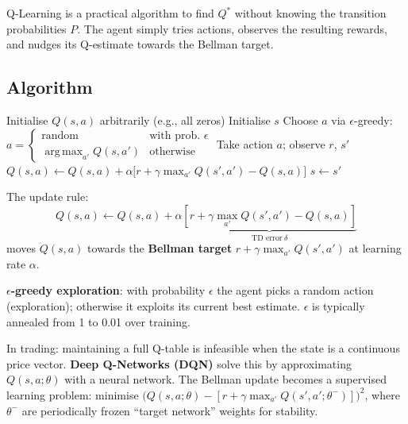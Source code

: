 \documentclass[12pt,a4paper]{article}
\DeclareMathOperator*{\argmax}{arg\,max}
\begin{document}
\begin{insbox}
Q-Learning is a practical algorithm to find $Q^*$ without knowing the
transition probabilities $P$.  The agent simply tries actions, observes
the resulting rewards, and nudges its Q-estimate towards the Bellman target.
\end{insbox}

\subsection{Algorithm}

\begin{algorithm}[H]
\caption{Q-Learning}
\begin{algorithmic}[1]
\State Initialise $Q(s,a)$ arbitrarily (e.g., all zeros)
  \State Initialise $s$
    \State Choose $a$ via $\epsilon$-greedy:
      $a = \begin{cases} \text{random} & \text{with prob.\ }\epsilon \\ \argmax_{a'} Q(s,a') & \text{otherwise} \end{cases}$
    \State Take action $a$; observe $r$, $s'$
    \State $Q(s,a) \leftarrow Q(s,a) + \alpha\bigl[r + \gamma \max_{a'} Q(s',a') - Q(s,a)\bigr]$
    \State $s \leftarrow s'$
  \EndWhile
\EndFor
\end{algorithmic}
\end{algorithm}

The update rule:
\begin{equation}
  Q(s,a) \leftarrow Q(s,a) + \alpha\underbrace{\left[
    r + \gamma \max_{a'} Q(s',a') - Q(s,a)
  \right]}_{\text{TD error}~\delta}
  \label{eq:qlearning}
\end{equation}
moves $Q(s,a)$ towards the \textbf{Bellman target}
$r + \gamma \max_{a'} Q(s',a')$ at learning rate $\alpha$.

\textbf{$\epsilon$-greedy exploration}: with probability $\epsilon$ the agent
picks a random action (exploration); otherwise it exploits its current best
estimate.  $\epsilon$ is typically annealed from 1 to 0.01 over training.

\begin{finbox}
In trading: maintaining a full Q-table is infeasible when the state is
a continuous price vector.  \textbf{Deep Q-Networks (DQN)} solve this by
approximating $Q(s,a;\theta)$ with a neural network.  The Bellman update
becomes a supervised learning problem: minimise
$\bigl(Q(s,a;\theta) - [r + \gamma \max_{a'}Q(s',a';\theta^-)]\bigr)^2$,
where $\theta^-$ are periodically frozen ``target network'' weights for
stability.
\end{finbox}
\end{document}
